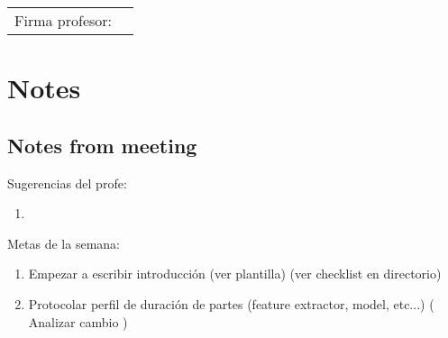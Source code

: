 \documentclass[12pt,oneside]{book}
\begin{document}
  \vfill

  \begin{tabular}{p{3 cm} p{10 cm}}
    Firma profesor: & \\
    \cline{2-2}
  \end{tabular}

  \newpage

  \section*{Notes}
  \setlength\parindent{0pt}

  \subsection*{Notes from meeting}

  Sugerencias del profe:
  \begin{enumerate}
    \item 
  \end{enumerate}

  Metas de la semana:
  \begin{enumerate}
    \item Empezar a escribir introducción (ver plantilla) (ver checklist en directorio)
    \item Protocolar perfil de duración de partes (feature extractor, model, etc...) (
      Analizar cambio
    )
  \end{enumerate}
\end{document}
